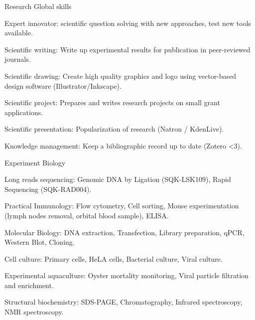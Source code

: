 

\begin{cventries}

  \cventry
    {Research} %
    {Global skills} %
    {} %
    {} %
    {
      \begin{cvitems} %
        \item {Expert innovator: scientific question solving with new approaches, test new tools available.}
        \item {Scientific writing: Write up experimental results for publication in peer-reviewed journals.}
        \item {Scientific drawing: Create high quality graphics and logo using vector-based design software (Illustrator/Inkscape).}
        \item {Scientific project: Prepares and writes research projects on small grant applications.}
        \item {Scientific presentation: Popularization of research (Natron / KdenLive).}
        \item {Knowledge management: Keep a bibliographic record up to date (Zotero <3).}
      \end{cvitems}
    }


  \cventry
    {Experiment} %
    {Biology} %
    {} %
    {} %
    {
      \begin{cvitems} %
        \item {Long reads sequencing: Genomic DNA by Ligation (SQK-LSK109), Rapid Sequencing (SQK-RAD004).}
        \item {Practical Immunology: Flow cytometry, Cell sorting, Mouse experimentation (lymph nodes removal, orbital blood sample), ELISA.}
        \item {Molecular Biology: DNA extraction, Transfection, Library preparation, qPCR, Western Blot, Cloning.}
        \item {Cell culture: Primary cells, HeLA cells, Bacterial culture, Viral culture.}
        \item {Experimental aquaculture: Oyster mortality monitoring, Viral particle filtration and enrichment.}
        \item {Structural biochemistry: SDS-PAGE, Chromatography, Infrared spectroscopy, NMR spectroscopy.}
      \end{cvitems}
    }


\end{cventries}
